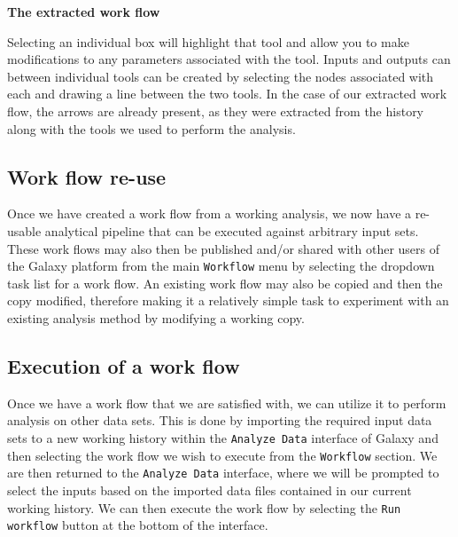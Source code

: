 \documentclass[a4paper,10pt]{article}
\begin{document}
\noindent\textbf{The extracted work flow}\vspace{1em}\\
\setlength\fboxsep{0pt}

Selecting an individual box will highlight that tool and allow you to make modifications to any parameters associated with the tool.  Inputs and outputs can between individual tools can be created by selecting the nodes associated with each and drawing a line between the two tools.  In the case of our extracted work flow, the arrows are already present, as they were extracted from the history along with the tools we used to perform the analysis.

\subsection{Work flow re-use}
Once we have created a work flow from a working analysis, we now have a re-usable analytical pipeline that can be executed against arbitrary input sets.  These work flows may also then be published and/or shared with other users of the Galaxy platform from the main \texttt{\footnotesize{Workflow}} menu by selecting the dropdown task list for a work flow.  An existing work flow may also be copied and then the copy modified, therefore making it a relatively simple task to experiment with an existing analysis method by modifying a working copy.

\subsection{Execution of a work flow}
Once we have a work flow that we are satisfied with, we can utilize it to perform analysis on other data sets.  This is done by importing the required input data sets to a new working history within the \texttt{\footnotesize{Analyze Data}} interface of Galaxy and then selecting the work flow we wish to execute from the \texttt{\footnotesize{Workflow}} section.  We are then returned to the \texttt{\footnotesize{Analyze Data}} interface, where we will be prompted to select the inputs based on the imported data files contained in our current working history.  We can then execute the work flow by selecting the \texttt{\footnotesize{Run workflow}} button at the bottom of the interface.
\end{document}

